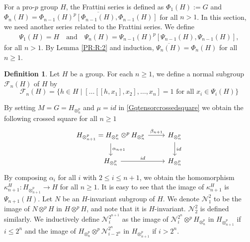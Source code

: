 \documentclass[12pt]{elsarticle}
\newtheorem*{main corollary*}{Main Corollary}
\theoremstyle{definition}
\newtheorem{definition}[theorem]{Definition}
\newcommand{\ptens}{
	\otimes^p}
\begin{document}
    For a pro-$p$ group $H$, the Frattini series is defined as $\Phi_1(H):=G$ and  $\Phi_n(H)=\overline{\Phi_{n-1}(H)^p[\Phi_{n-1}(H),\Phi_{n-1}(H)]}$ for all $n>1$. In this section, we need another series related to the Frattini series. We define 
    \begin{align*}
        \Psi_1(H)=H \quad \text{and} \quad \Psi_n(H)=\Psi_{n-1}(H)^p[\Psi_{n-1}(H),\Psi_{n-1}(H)],
    \end{align*}
    for all $n>1$. By Lemma \ref{PR:R:2} and induction, $\overline{\Psi_n(H)}=\Phi_n(H)$ for all $n\geq 1$.


\begin{definition}\label{Frattini-normal subgroup}
    Let $H$ be a group. For each $n \geq 1$, we define a normal subgroup $\mathcal{F}_n(H)$ of $H$ by $$\mathcal{F}_n(H)=\{h \in H \mid [ \ldots [[h,x_1],x_2],\ldots,x_n]=1 \text{ for all }x_i \in \Psi_i(H) \}$$
\end{definition}

By setting $M=G=H_{\ptens_n}$ and $\mu=id$ in \eqref{Gqtensorcrossedsquare} we obtain the following crossed square for all $n \geq 1$
  \begin{equation} \label{n fold qtensorsquare_n}
\begin{tikzcd} 
		H_{\ptens_{n+1}}=H_{\ptens_n}\ptens H_{\ptens_n} \arrow[r,"\beta_{n+1}"] \arrow[d,"\alpha_{n+1}"] & H_{\ptens_n} \arrow[d,"id"] \\
		H_{\ptens_n} \arrow[r,"id"] & H_{\ptens_n}
  \end{tikzcd}
\end{equation}
By composing $\alpha_i$ for all $i$ with $2 \leq i \leq n+1$, we obtain the homomorphism ${\kappa_{n+1}^H : H_{\ptens_{n+1}} \to H}$ for all $n \geq 1$. It is easy to see that the image of $\kappa_{n+1}^H$ is $\Psi_{n+1}(H)$. Let $N$ be an $H$-invariant subgroup of $H$. We denote $\mathcal{N}_1^2$ to be the image of $N \ptens H$ in $H \ptens H$, and note that it is $H$-invariant. $\mathcal{N}_2^2$ is defined similarly. We inductively define $\mathcal{N}_i^{2^{n+1}}$ as the image of $\mathcal{N}_i^{2^n} \ptens H_{\ptens_n}$ in $H_{\ptens_{n+1}}$ if $i \leq 2^n$ and the image of $H_{\ptens_n} \ptens \mathcal{N}_{i-2^n}^{2^n} $ in $H_{\ptens_{n+1}}$ if $i > 2^n$.
\end{document}
